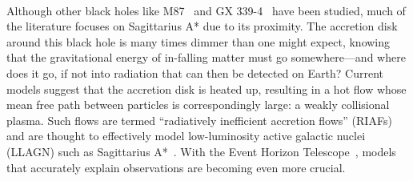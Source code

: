 \\
Although other black holes like M87~\cite{Ressler2015,Oezel2001,Foucart2015,Broderick2015} and GX 339-4~\cite{Plant2014} have been studied, much of the literature focuses on Sagittarius A* due to its proximity. The accretion disk around this black hole is many times dimmer than one might expect, knowing that the gravitational energy of in-falling matter must go somewhere---and where does it go, if not into radiation that can then be detected on Earth? Current models suggest that the accretion disk is heated up, resulting in a hot flow whose mean free path between particles is correspondingly large: a weakly collisional plasma. Such flows are termed ``radiatively inefficient accretion flows'' (RIAFs) and are thought to effectively model low-luminosity active galactic nuclei (LLAGN) such as Sagittarius A*~\cite{Rohan1998,Broderick2011,Broderick2009,Dexter2013,Yuan2003}. With the Event Horizon Telescope~\cite{Doeleman2009}, models that accurately explain observations are becoming even more crucial.

